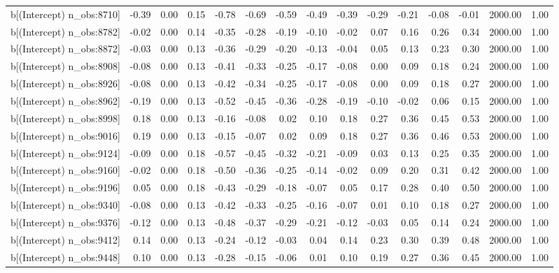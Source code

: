 \begin{table}[ht]
\begin{tabular}{rrrrrrrrrrrrrrr}
  b[(Intercept) n\_obs:8710] & -0.39 & 0.00 & 0.15 & -0.78 & -0.69 & -0.59 & -0.49 & -0.39 & -0.29 & -0.21 & -0.08 & -0.01 & 2000.00 & 1.00 \\ 
  b[(Intercept) n\_obs:8782] & -0.02 & 0.00 & 0.14 & -0.35 & -0.28 & -0.19 & -0.10 & -0.02 & 0.07 & 0.16 & 0.26 & 0.34 & 2000.00 & 1.00 \\ 
  b[(Intercept) n\_obs:8872] & -0.03 & 0.00 & 0.13 & -0.36 & -0.29 & -0.20 & -0.13 & -0.04 & 0.05 & 0.13 & 0.23 & 0.30 & 2000.00 & 1.00 \\ 
  b[(Intercept) n\_obs:8908] & -0.08 & 0.00 & 0.13 & -0.41 & -0.33 & -0.25 & -0.17 & -0.08 & 0.00 & 0.09 & 0.18 & 0.24 & 2000.00 & 1.00 \\ 
  b[(Intercept) n\_obs:8926] & -0.08 & 0.00 & 0.13 & -0.42 & -0.34 & -0.25 & -0.17 & -0.08 & 0.00 & 0.09 & 0.18 & 0.27 & 2000.00 & 1.00 \\ 
  b[(Intercept) n\_obs:8962] & -0.19 & 0.00 & 0.13 & -0.52 & -0.45 & -0.36 & -0.28 & -0.19 & -0.10 & -0.02 & 0.06 & 0.15 & 2000.00 & 1.00 \\ 
  b[(Intercept) n\_obs:8998] & 0.18 & 0.00 & 0.13 & -0.16 & -0.08 & 0.02 & 0.10 & 0.18 & 0.27 & 0.36 & 0.45 & 0.53 & 2000.00 & 1.00 \\ 
  b[(Intercept) n\_obs:9016] & 0.19 & 0.00 & 0.13 & -0.15 & -0.07 & 0.02 & 0.09 & 0.18 & 0.27 & 0.36 & 0.46 & 0.53 & 2000.00 & 1.00 \\ 
  b[(Intercept) n\_obs:9124] & -0.09 & 0.00 & 0.18 & -0.57 & -0.45 & -0.32 & -0.21 & -0.09 & 0.03 & 0.13 & 0.25 & 0.35 & 2000.00 & 1.00 \\ 
  b[(Intercept) n\_obs:9160] & -0.02 & 0.00 & 0.18 & -0.50 & -0.36 & -0.25 & -0.14 & -0.02 & 0.09 & 0.20 & 0.31 & 0.42 & 2000.00 & 1.00 \\ 
  b[(Intercept) n\_obs:9196] & 0.05 & 0.00 & 0.18 & -0.43 & -0.29 & -0.18 & -0.07 & 0.05 & 0.17 & 0.28 & 0.40 & 0.50 & 2000.00 & 1.00 \\ 
  b[(Intercept) n\_obs:9340] & -0.08 & 0.00 & 0.13 & -0.42 & -0.33 & -0.25 & -0.16 & -0.07 & 0.01 & 0.10 & 0.18 & 0.27 & 2000.00 & 1.00 \\ 
  b[(Intercept) n\_obs:9376] & -0.12 & 0.00 & 0.13 & -0.48 & -0.37 & -0.29 & -0.21 & -0.12 & -0.03 & 0.05 & 0.14 & 0.24 & 2000.00 & 1.00 \\ 
  b[(Intercept) n\_obs:9412] & 0.14 & 0.00 & 0.13 & -0.24 & -0.12 & -0.03 & 0.04 & 0.14 & 0.23 & 0.30 & 0.39 & 0.48 & 2000.00 & 1.00 \\ 
  b[(Intercept) n\_obs:9448] & 0.10 & 0.00 & 0.13 & -0.28 & -0.15 & -0.06 & 0.01 & 0.10 & 0.19 & 0.27 & 0.36 & 0.45 & 2000.00 & 1.00 \\ 

\end{tabular}
\end{table}
